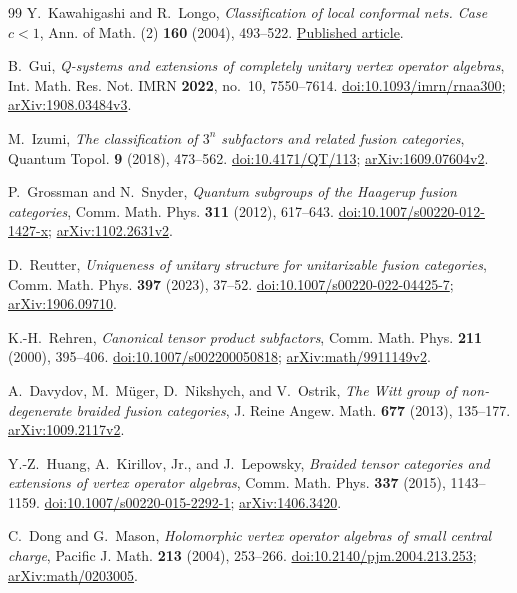 \begin{thebibliography}{99}
Y.~Kawahigashi and R.~Longo,
\emph{Classification of local conformal nets. Case $c<1$},
Ann. of Math. (2) \textbf{160} (2004), 493--522.
\href{https://annals.math.princeton.edu/wp-content/uploads/annals-v160-n2-p04.pdf}{Published article}.

B.~Gui,
\emph{Q-systems and extensions of completely unitary vertex operator algebras},
Int. Math. Res. Not. IMRN \textbf{2022}, no.~10, 7550--7614.
\href{https://doi.org/10.1093/imrn/rnaa300}{doi:10.1093/imrn/rnaa300};
\href{https://arxiv.org/abs/1908.03484v3}{arXiv:1908.03484v3}.

M.~Izumi,
\emph{The classification of $3^n$ subfactors and related fusion categories},
Quantum Topol. \textbf{9} (2018), 473--562.
\href{https://doi.org/10.4171/QT/113}{doi:10.4171/QT/113};
\href{https://arxiv.org/abs/1609.07604v2}{arXiv:1609.07604v2}.

P.~Grossman and N.~Snyder,
\emph{Quantum subgroups of the Haagerup fusion categories},
Comm. Math. Phys. \textbf{311} (2012), 617--643.
\href{https://doi.org/10.1007/s00220-012-1427-x}{doi:10.1007/s00220-012-1427-x};
\href{https://arxiv.org/abs/1102.2631v2}{arXiv:1102.2631v2}.

D.~Reutter,
\emph{Uniqueness of unitary structure for unitarizable fusion categories},
Comm. Math. Phys. \textbf{397} (2023), 37--52.
\href{https://doi.org/10.1007/s00220-022-04425-7}{doi:10.1007/s00220-022-04425-7};
\href{https://arxiv.org/abs/1906.09710}{arXiv:1906.09710}.

K.-H.~Rehren,
\emph{Canonical tensor product subfactors},
Comm. Math. Phys. \textbf{211} (2000), 395--406.
\href{https://doi.org/10.1007/s002200050818}{doi:10.1007/s002200050818};
\href{https://arxiv.org/abs/math/9911149v2}{arXiv:math/9911149v2}.

A.~Davydov, M.~M\"uger, D.~Nikshych, and V.~Ostrik,
\emph{The Witt group of non-degenerate braided fusion categories},
J. Reine Angew. Math. \textbf{677} (2013), 135--177.
\href{https://arxiv.org/abs/1009.2117v2}{arXiv:1009.2117v2}.

Y.-Z.~Huang, A.~Kirillov, Jr., and J.~Lepowsky,
\emph{Braided tensor categories and extensions of vertex operator algebras},
Comm. Math. Phys. \textbf{337} (2015), 1143--1159.
\href{https://doi.org/10.1007/s00220-015-2292-1}{doi:10.1007/s00220-015-2292-1};
\href{https://arxiv.org/abs/1406.3420}{arXiv:1406.3420}.

C.~Dong and G.~Mason,
\emph{Holomorphic vertex operator algebras of small central charge},
Pacific J. Math. \textbf{213} (2004), 253--266.
\href{https://doi.org/10.2140/pjm.2004.213.253}{doi:10.2140/pjm.2004.213.253};
\href{https://arxiv.org/abs/math/0203005}{arXiv:math/0203005}.


\end{thebibliography}

